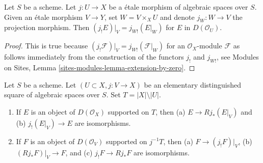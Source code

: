 \begin{lemma}
\label{lemma-restrict-lower-shriek}
Let $S$ be a scheme. Let $j : U \to X$ be a \'etale morphism of algebraic
spaces over $S$. Given an \'etale morphism $V \to Y$, set $W = V \times_X U$
and denote $j_W : W \to V$ the projection morphism. Then
$(j_!E)|_V = j_{W!}(E|_W)$ for $E$ in $D(\mathcal{O}_U)$.
\end{lemma}

\begin{proof}
This is true because
$(j_!\mathcal{F})|_V = j_{W!}(\mathcal{F}|_W)$
for an $\mathcal{O}_X$-module $\mathcal{F}$ as follows immediately 
from the construction of the functors $j_!$ and $j_{W!}$, see
Modules on Sites, Lemma \ref{sites-modules-lemma-extension-by-zero}.
\end{proof}

\begin{lemma}
\label{lemma-pushforward-with-support-in-open}
Let $S$ be a scheme. Let $(U \subset X, j : V \to X)$ be an elementary
distinguished square of algebraic spaces over $S$. Set
$T = |X| \setminus |U|$.
\begin{enumerate}
\item If $E$ is an object of $D(\mathcal{O}_X)$ supported on $T$, then
(a) $E \to Rj_*(E|_V)$ and (b) $j_!(E|_V) \to E$ are isomorphisms.
\item If $F$ is an object of $D(\mathcal{O}_V)$ supported on $j^{-1}T$, then
(a) $F \to (j_!F)|_V$, (b) $(Rj_*F)|_V \to F$, and (c)
$j_!F \to Rj_*F$ are isomorphisms.
\end{enumerate}
\end{lemma}

